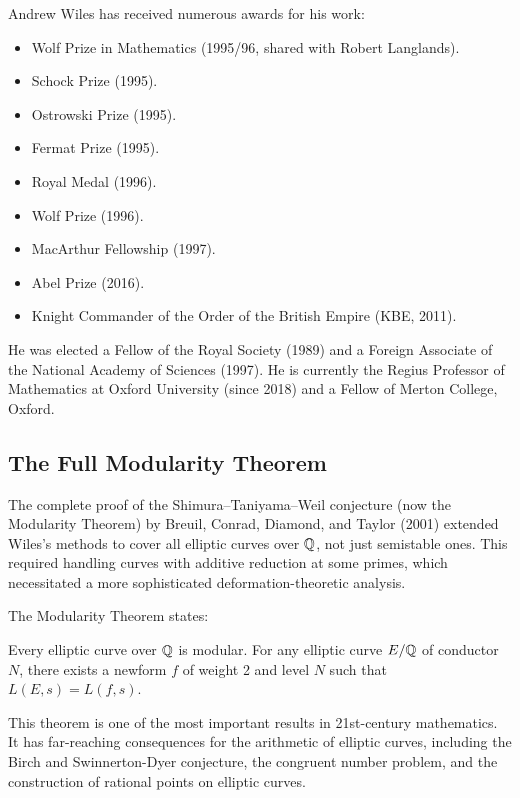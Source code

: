 Andrew Wiles has received numerous awards for his work:

\begin{itemize}
    \item Wolf Prize in Mathematics (1995/96, shared with Robert Langlands).
    \item Schock Prize (1995).
    \item Ostrowski Prize (1995).
    \item Fermat Prize (1995).
    \item Royal Medal (1996).
    \item Wolf Prize (1996).
    \item MacArthur Fellowship (1997).
    \item Abel Prize (2016).
    \item Knight Commander of the Order of the British Empire (KBE, 2011).
\end{itemize}

He was elected a Fellow of the Royal Society (1989) and a Foreign Associate of the National Academy of Sciences (1997). He is currently the Regius Professor of Mathematics at Oxford University (since 2018) and a Fellow of Merton College, Oxford.

\subsection{The Full Modularity Theorem}

The complete proof of the Shimura--Taniyama--Weil conjecture (now the Modularity Theorem) by Breuil, Conrad, Diamond, and Taylor (2001) extended Wiles's methods to cover all elliptic curves over \(\mathbb{Q}\), not just semistable ones. This required handling curves with additive reduction at some primes, which necessitated a more sophisticated deformation-theoretic analysis.

The Modularity Theorem states:

\begin{theorem}
Every elliptic curve over \(\mathbb{Q}\) is modular. For any elliptic curve \(E/\mathbb{Q}\) of conductor \(N\), there exists a newform \(f\) of weight 2 and level \(N\) such that \(L(E,s) = L(f,s)\).
\end{theorem}

This theorem is one of the most important results in 21st-century mathematics. It has far-reaching consequences for the arithmetic of elliptic curves, including the Birch and Swinnerton-Dyer conjecture, the congruent number problem, and the construction of rational points on elliptic curves.

